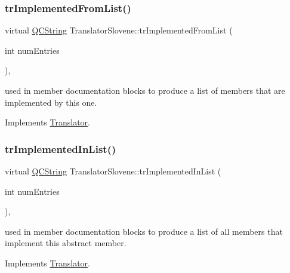 \mbox{\label{class_translator_slovene_a2dae700b74c58ab3a90307d16260c49e}} 
\subsubsection{\texorpdfstring{trImplementedFromList()}{trImplementedFromList()}}
{\footnotesize\ttfamily virtual \mbox{\hyperlink{class_q_c_string}{Q\+C\+String}} Translator\+Slovene\+::tr\+Implemented\+From\+List (\begin{DoxyParamCaption}\item[{int}]{num\+Entries }\end{DoxyParamCaption})\hspace{0.3cm}{\ttfamily [inline]}, {\ttfamily [virtual]}}

used in member documentation blocks to produce a list of members that are implemented by this one. 

Implements \mbox{\hyperlink{class_translator}{Translator}}.

\mbox{\label{class_translator_slovene_aa7c820df57e5a0bc462144c45284375a}} 
\subsubsection{\texorpdfstring{trImplementedInList()}{trImplementedInList()}}
{\footnotesize\ttfamily virtual \mbox{\hyperlink{class_q_c_string}{Q\+C\+String}} Translator\+Slovene\+::tr\+Implemented\+In\+List (\begin{DoxyParamCaption}\item[{int}]{num\+Entries }\end{DoxyParamCaption})\hspace{0.3cm}{\ttfamily [inline]}, {\ttfamily [virtual]}}

used in member documentation blocks to produce a list of all members that implement this abstract member. 

Implements \mbox{\hyperlink{class_translator}{Translator}}.

\mbox{\label{class_translator_slovene_aa59b374f5a40cd6958dd5f24e43bed02}} 
